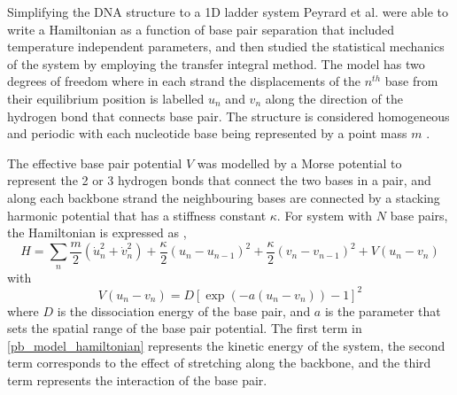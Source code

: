 Simplifying the DNA structure to a 1D ladder system Peyrard et al. were able to write a  Hamiltonian as a function of base pair separation that included temperature independent parameters, and then studied the statistical mechanics of the system by employing the transfer integral method. The model has two degrees of freedom where in each strand the displacements of the $n^{th}$ base from their equilibrium position is labelled $u_{n}$ and $v_{n}$ along the direction of the hydrogen bond that connects base pair. The structure is considered homogeneous and periodic with each nucleotide base being represented by a point mass $m$ \cite{Peyrard1989a}.

The effective base pair potential $V$ was modelled by a Morse potential to represent the 2 or 3 hydrogen bonds that connect the two bases in a pair, and along each backbone  strand the neighbouring bases are connected by a stacking harmonic potential that has a stiffness constant $\kappa$. For system with $N$ base pairs, the Hamiltonian is expressed as \cite{Peyrard1989a},
%
\begin{equation}
H=\sum_{n}\frac{m}{2}\left( \dot{u}_{n}^{2} + \dot{v}_{n}^{2}  \right) +\frac{\kappa}{2}\left(u_{n}-u_{n-1}\right)^{2} + \frac{\kappa}{2}\left(v_{n}-v_{n-1}\right)^{2}+V \left(u_{n}-v_{n}\right)
\label{pb_model_hamiltonian}
\end{equation}
%
with
%
\begin{equation}
V \left(u_{n}-v_{n}\right) = D\left[\exp \left(-a\left( u_{n}-v_{n} \right) \right) -1\right]^{2}
\label{pb_model_bp_potential}
\end{equation}
%
where $D$ is the dissociation energy of the base pair, and $a$ is the parameter that sets the spatial range of the base pair potential. The first term in \eqref{pb_model_hamiltonian} represents the kinetic energy of the system, the second term corresponds to the effect of stretching along the backbone, and the third term represents the interaction of the base pair. 


